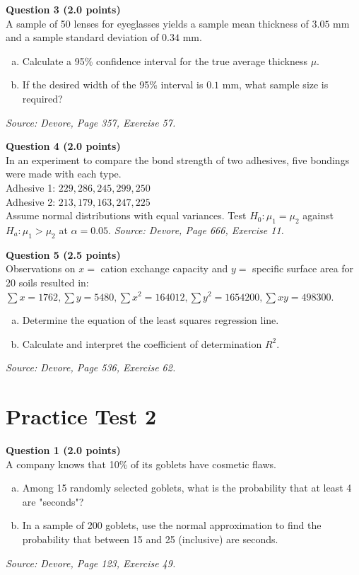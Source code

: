 \documentclass[11pt,a4paper]{article}
\begin{document}
\vspace{1em}
\noindent \textbf{Question 3 (2.0 points)} \\
A sample of 50 lenses for eyeglasses yields a sample mean thickness of $3.05$ mm and a sample standard deviation of $0.34$ mm.
\begin{enumerate}[(a)]
    \item Calculate a 95\% confidence interval for the true average thickness $\mu$.
    \item If the desired width of the 95\% interval is $0.1$ mm, what sample size is required?
\end{enumerate}
\textit{Source: Devore, Page 357, Exercise 57.}

\vspace{1em}
\noindent \textbf{Question 4 (2.0 points)} \\
In an experiment to compare the bond strength of two adhesives, five bondings were made with each type. \\
Adhesive 1: $229, 286, 245, 299, 250$ \\
Adhesive 2: $213, 179, 163, 247, 225$ \\
Assume normal distributions with equal variances. Test $H_0: \mu_1 = \mu_2$ against $H_a: \mu_1 > \mu_2$ at $\alpha = 0.05$.
\textit{Source: Devore, Page 666, Exercise 11.}

\vspace{1em}
\noindent \textbf{Question 5 (2.5 points)} \\
Observations on $x = $ cation exchange capacity and $y = $ specific surface area for 20 soils resulted in:
$\sum x = 1762, \sum y = 5480, \sum x^2 = 164012, \sum y^2 = 1654200, \sum xy = 498300$.
\begin{enumerate}[(a)]
    \item Determine the equation of the least squares regression line.
    \item Calculate and interpret the coefficient of determination $R^2$.
\end{enumerate}
\textit{Source: Devore, Page 536, Exercise 62.}

\newpage

\section*{Practice Test 2}

\noindent \textbf{Question 1 (2.0 points)} \\
A company knows that 10\% of its goblets have cosmetic flaws.
\begin{enumerate}[(a)]
    \item Among 15 randomly selected goblets, what is the probability that at least 4 are "seconds"?
    \item In a sample of 200 goblets, use the normal approximation to find the probability that between 15 and 25 (inclusive) are seconds.
\end{enumerate}
\textit{Source: Devore, Page 123, Exercise 49.}
\end{document}

